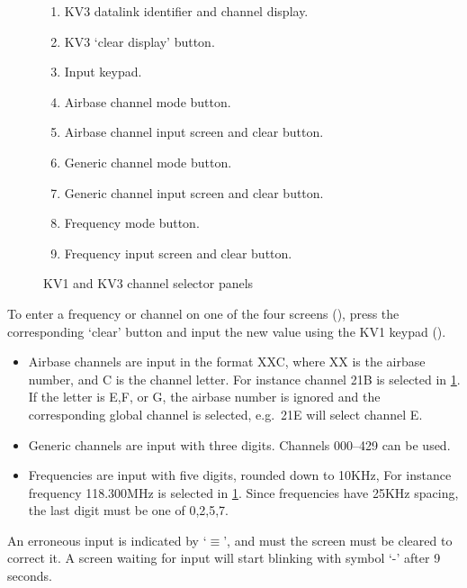 \documentclass[a4paper]{report}
\begin{document}
{\begin{figure}[h]
    \begin{enumerate}[nosep]
      \item \label{item:kv3-display} KV3 datalink identifier and channel display.
      \item \label{item:kv3-clear} KV3 `clear display' button.
      \item \label{item:kv1-keypad} Input keypad.
      \item \label{item:kv1-base-button} Airbase channel mode button.
      \item \label{item:kv1-base-screen} Airbase channel input screen and clear button.
      \item \label{item:kv1-nr-button} Generic channel mode button.
      \item \label{item:kv1-nr-screen} Generic channel input screen and clear button.
      \item \label{item:kv1-mhz-button} Frequency mode button.
      \item \label{item:kv1-mhz-screen} Frequency input screen and clear button.
    \end{enumerate}
    \caption{KV1 and KV3 channel selector panels}
    \label{fig:kv1}
  \end{figure}

  To enter a frequency or channel on one of the four screens
  (),
  press the corresponding `clear' button and input the new value using the KV1 keypad
  ().
  \begin{itemize}[noitemsep]
    \item Airbase channels are input in the format XXC, where XX is the airbase number, and C is the channel letter.
      For instance channel 21B is selected in \cref{fig:kv1}.
      If the letter is E,F, or G, the airbase number is ignored and the
      corresponding global channel is selected, e.g.\ 21E will select channel E.
    \item Generic channels are input with three digits. Channels 000--429 can be used.
    \item Frequencies are input with five digits, rounded down to 10KHz,
      For instance frequency 118.300MHz is selected in \cref{fig:kv1}.
      Since frequencies have 25KHz spacing, the last digit must be one of 0,2,5,7.
  \end{itemize}
  An erroneous input is indicated by `$\equiv$', and must the screen must be cleared to correct it.
  A screen waiting for input will start blinking with symbol `-' after 9 seconds.

}
\end{document}

